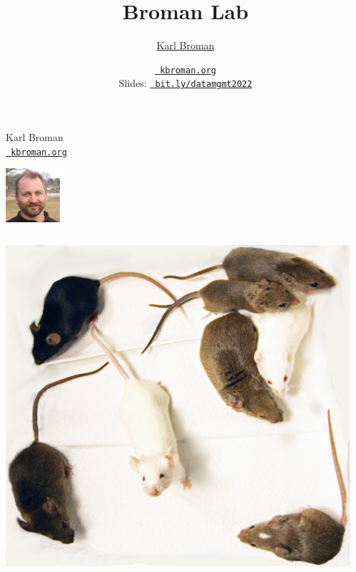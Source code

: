 \documentclass[aspectratio=169,12pt,t]{beamer}
\title{Broman Lab}
\author{\href{https://kbroman.org}{Karl Broman}}
\institute{Biostatistics \& Medical Informatics \\ Univ.\ Wisconsin{\textendash}Madison}
\date{\href{https://kbroman.org}{\tt \scriptsize \color{foreground} kbroman.org}
\\[2pt]
\scriptsize {\lolit Slides:} \href{https://bit.ly/datamgmt2022}{\tt \scriptsize
  \color{foreground} bit.ly/datamgmt2022}
}
\begin{document}
{

\begin{frame}{Karl Broman \\[-6pt]
    \href{https://kbroman.org}{\tt \small \color{foreground} kbroman.org}}

  \vspace*{-15mm} \hspace{30mm}
  \includegraphics[height=20mm]{Figs/karl_2014-03-30_square.jpg}

  \begin{columns}
    \begin{column}{0.25\textwidth}

      \includegraphics[height=0.4\textheight]{Figs/cc_founders.png}

    \end{column}

    \begin{column}{0.3\textwidth}


\end{column}
\end{columns}
\end{frame}}
\end{document}
